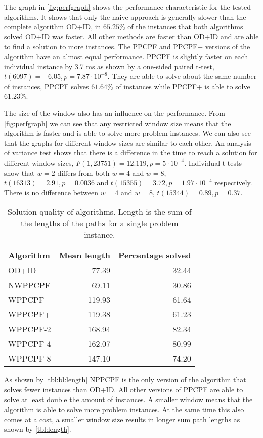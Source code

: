 The graph in \autoref{fig:perfgraph} shows the performance characteristic for
the tested algorithms. It shows that only the naive approach is generally
slower than the complete algorithm OD+ID, in $65.25\%$ of the instances that
both algorithms solved OD+ID was faster. All other methods are faster than
OD+ID and are able to find a solution to more instances. The PPCPF and PPCPF+
versions of the algorithm have an almost equal performance. PPCPF is
slightly faster on each individual instance by 3.7 ms as shown by a one-sided
paired t-test, $t(6097) = -6.05, p=7.87 \cdot 10^{-8}$. They are able to solve
about the same number of instances, PPCPF solves $61.64\%$ of
instances while PPCPF+ is able to solve $61.23\%$.

The size of the window also has an influence on the performance. From
\autoref{fig:perfgraph} we can see that any restricted window size means that
the algorithm is faster and is able to solve more problem instances. We can
also see that the graphs for different window sizes are similar to each other.
An analysis of variance test shows that there is a difference in the time to
reach a solution for different window sizes, $F(1, 23751) = 12.119, p=5\cdot
10^{-4}$. Individual t-tests show that $w=2$ differs from both $w=4$ and $w=8$,
$t(16313) = 2.91, p=0.0036$ and $t(15355)=3.72, p=1.97\cdot10^{-4}$
respectively. There is no difference between $w=4$ and $w=8$, $t(15344)=0.89,
p=0.37$.

\begin{table}[t]
	\centering
	\caption{Solution quality of algorithms. Length is the sum of the lengths
	of the paths for a single problem instance.}
	\label{tbl:length}
	\begin{tabular}{l|r|r}
		Algorithm & Mean length & Percentage solved \\ \hline
		OD+ID & 77.39 & 32.44 \\
		NWPPCPF & 69.11 & 30.86 \\
		WPPCPF  & 119.93 & 61.64 \\
		WPPCPF+ & 119.38 & 61.23 \\
		WPPCPF-2 & 168.94 & 82.34 \\
		WPPCPF-4 & 162.07 & 80.99 \\
		WPPCPF-8 & 147.10 & 74.20
	\end{tabular}
\end{table}

As shown by \autoref{tbl:bl:length} NPPCPF is the only version of the algorithm
that solves fewer instances than OD+ID. All other versions of PPCPF are able to
solve at least double the amount of instances. A smaller window means that the
algorithm is able to solve more problem instances. At the same time this also
comes at a cost, a smaller window size results in longer sum path lengths as
shown by \autoref{tbl:length}.

%	

%	
